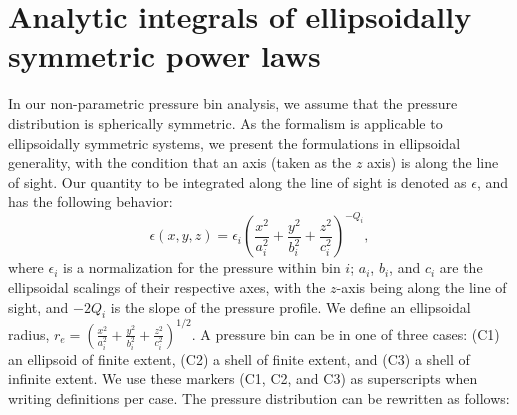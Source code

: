 \documentclass[onecolumn,traditabstract]{aa}
\begin{document}
\appendix

\section{Analytic integrals of ellipsoidally symmetric power laws}
\label{sec:analytic_integrals}

In our non-parametric pressure bin analysis, we assume that the pressure distribution is spherically symmetric.
As the formalism is applicable to ellipsoidally symmetric systems, we present the formulations in ellipsoidal
generality, with the condition that an axis (taken as the $z$ axis) is along the line of sight.
Our quantity to be integrated along the line of sight is denoted as $\epsilon$, and has the
following behavior:
\begin{equation}
  \epsilon(x,y,z) = \epsilon_i (\frac{x^2}{a_i^2}+\frac{y^2}{b_i^2}+\frac{z^2}{c_i^2})^{-Q_i},
\end{equation}
where $\epsilon_i$ is a normalization for the pressure within bin $i$;
$a_i$, $b_i$, and $c_i$ are the ellipsoidal scalings of their respective axes,
with the $z$-axis being along the line of sight, and $-2Q_i$ is the slope of the pressure profile. We define an
ellipsoidal radius, $r_e = (\frac{x^2}{a_i^2}+\frac{y^2}{b_i^2}+\frac{z^2}{c_i^2})^{1/2}$.
A pressure bin can be in one of three cases: (C1) an ellipsoid of finite extent, (C2) a shell of
finite extent, and (C3) a shell of infinite extent. We use these markers (C1, C2, and C3) as superscripts
when writing definitions per case. The pressure distribution can be rewritten as follows:
\end{document}
